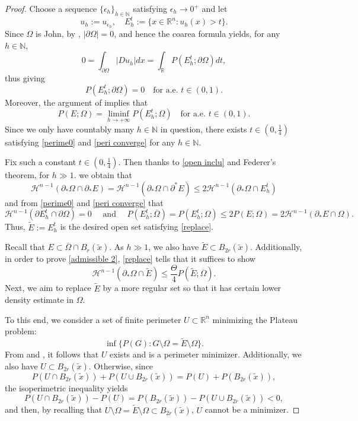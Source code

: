\documentclass[reqno,11pt]{amsart}
\numberwithin{equation}{section}
\theoremstyle{remark}
\begin{document}
\begin{proof}
Choose a sequence $\{\epsilon_h\}_{h\in\mathbb N}$ satisfying $\epsilon_h \to 0^+$ and let $$u_h:=u_{\epsilon_h},\quad E_{h}^t:=\{x\in \mathbb R^n: u_{h}(x)>t\}.$$ 
Since $\Omega$ is John, by \cite[Theorem 2.8]{V2000},
$|\partial\Omega|=0$, and hence the coarea formula  yields, for any $h\in \mathbb N$, 
$$0=\int_{\partial\Omega}|Du_{h}|dx=\int_{\mathbb R} P(E_h^t;\partial\Omega) dt,$$ 
thus giving
\begin{equation}\label{perime0}
    P(E_h^t;\partial\Omega)=0\quad \text{for a.e. }t\in (0,1).
\end{equation}
Moreover, the argument of \cite[Theorem 13.8]{M2012} implies that
\begin{equation}\label{peri converge}
    P(E;\Omega)=\liminf_{h\to +\infty}P(E_h^t;\Omega) \quad \text{for a.e. } t\in (0,1).
\end{equation}
Since we only have countably many $h\in \mathbb N$ in question, there exists $t\in (0,\frac{1}{4})$ satisfying \eqref{perime0} and \eqref{peri converge} for any $h\in \mathbb N$.

Fix such a constant $t\in (0,\frac{1}{4})$. 
Then thanks to \eqref{open inclu} and Federer's theorem, for $h\gg 1$. we obtain that  
$$\mathcal{H}^{n-1}(\partial_*\Omega\cap \partial_*E)=\mathcal{H}^{n-1}(\partial_*\Omega\cap \partial^*E)\le 2\mathcal{H}^{n-1}(\partial_*\Omega\cap E_h^t)$$
and from \eqref{perime0} and \eqref{peri converge} that
$$
 \mathcal H^{n-1}(\partial E^t_h\cap \partial \Omega)=0 \quad \text{ and } \quad  P(E_h^t;\overline{\Omega})= P(E_h^t;\Omega)\le 2P(E;\Omega)= 2\mathcal{H}^{n-1}(\partial_*E\cap \Omega).
$$
 Thus, $\widetilde E:=E_h^t$ is the desired open set satisfying \eqref{replace}.
 
 Recall that $E\subset \overline{\Omega} \cap B_r(\widetilde x)$. As $h\gg 1$, we also have   
$\widetilde E\subset B_{2r}(\widetilde x)$.
 Additionally, in order to prove \eqref{admissible 2}, \eqref{replace} tells that it suffices to show 
\begin{equation}\label{regu epsi}
\mathcal{H}^{n-1}(\partial_*\Omega\cap \widetilde E) \le \frac{\Theta }{4}P(\widetilde E;\overline{\Omega}).
\end{equation}
\medskip
{}
Next, we aim to replace $\widetilde E$ by a more regular set so that it has certain lower density estimate in $\Omega$.

To this end, we consider a set of finite perimeter $ U\subset \mathbb R^n$ minimizing the Plateau problem:
$$\inf\{P(G): G\setminus \Omega = \widetilde E\setminus\Omega\}.$$
From \cite[Proposition 12.29]{M2012} and \cite[Example 16.13]{M2012},  it follows that $ U$ exists and is a perimeter minimizer. Additionally, we also have $U\subset B_{2r}(\widetilde x)$. Otherwise, since
$$P(U\cap B_{2r}(\widetilde x))+P(U\cup B_{2r}(\widetilde x))=P(U) + P(B_{2r}(\widetilde x)),$$
the isoperimetric inequality yields
$$P(U\cap B_{2r}(\widetilde x))-P(U)= P(B_{2r}(\widetilde x))-P(U\cup B_{2r}(\widetilde x))< 0,$$
and then, by recalling that $U\setminus \Omega=\widetilde E\setminus \Omega\subset B_{2r}(\widetilde x)$, $U$ cannot be a minimizer.


\end{proof}
\end{document}
